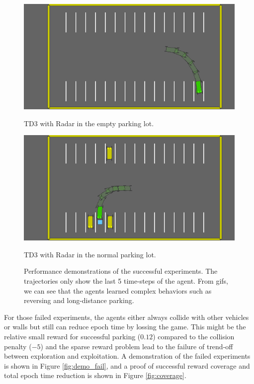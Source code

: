 \documentclass{article}
\begin{document}
\begin{figure}[h]
  \begin{minipage}[b]{0.45\textwidth}
    \centering
    \includegraphics[width=\textwidth]{./pics/good/kine_TD3_empty.png}
    \caption*{TD3 with Radar in the empty parking lot.}
  \end{minipage}
  \hfill
  \begin{minipage}[b]{0.45\textwidth}
    \centering
    \includegraphics[width=\textwidth]{./pics/good/kine_TD3_normal.png}
    \caption*{TD3 with Radar in the normal parking lot.}
  \end{minipage}

  \caption{Performance demonstrations of the successful experiments. The trajectories only show the last 5 time-steps of the agent. From gifs, we can see that the agents learned complex behaviors such as reversing and long-distance parking.}
  \label{fig:demo}
\end{figure}

For those failed experiments, the agents either always collide with other vehicles or walls but still can reduce epoch time by lossing the game. This might be the relative small reward for successful parking ($0.12$) compared to the collision penalty ($-5$) and the sparse reward problem lead to the failure of trend-off between exploration and exploitation. A demonstration of the failed experiments is shown in Figure \ref{fig:demo_fail}, and a proof of successful reward coverage and total epoch time reduction is shown in Figure \ref{fig:coverage}.
\end{document}
